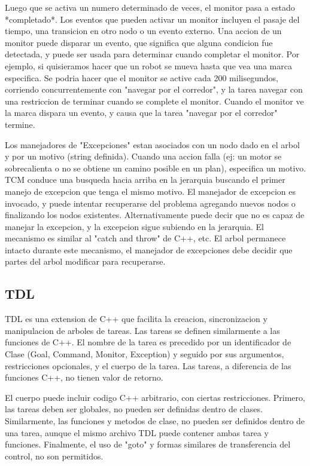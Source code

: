 Luego que se activa un numero determinado de veces, el monitor pasa a 
estado *completado*.
Los eventos que pueden activar un monitor incluyen el pasaje del tiempo, una 
transicion en otro nodo o un evento externo.
Una accion de un monitor puede disparar un evento, que significa que alguna 
condicion fue detectada, y puede ser usada para determinar
cuando completar el monitor.
Por ejemplo, si quisieramos hacer que un robot se mueva hasta que vea una 
marca especifica. Se podria hacer que el monitor se active cada 
200 milisegundos, corriendo concurrentemente con "navegar por el corredor", y 
la tarea navegar con una restriccion de terminar cuando
se complete el monitor.
Cuando el monitor ve la marca dispara un evento, y causa que la tarea "navegar 
por el corredor" termine.

Los manejadores de "Excepciones" estan asociados con un nodo dado en el arbol 
y por un motivo (string definida).
Cuando una accion falla (ej: un motor se sobrecalienta o no se obtiene un 
camino posible en un plan), especifica 
un motivo.
TCM conduce una busqueda hacia arriba en la jerarquia buscando el primer 
manejo de excepcion que tenga el mismo motivo.
El manejador de excepcion es invocado, y puede intentar recuperarse del 
problema agregando nuevos nodos o finalizando los nodos
existentes.
Alternativamente puede decir que no es capaz de manejar la excepcion, y la 
excepcion sigue subiendo en la jerarquia.
El mecanismo es similar al "catch and throw" de C++, etc.
El arbol permanece intacto durante este mecanismo, el manejador de excepciones 
debe decidir que partes del arbol modificar para recuperarse.


\subsection{TDL}

TDL es una extension de C++ que facilita la creacion, sincronizacion y 
manipulacion de arboles de tareas.
Las tareas se definen similarmente a las funciones de C++.
El nombre de la tarea es precedido por un identificador de Clase (Goal, 
Command, Monitor, Exception) y seguido por sus argumentos,
restricciones opcionales, y el cuerpo de la tarea.
Las tareas, a diferencia de las funciones C++, no tienen valor de retorno.

El cuerpo puede incluir codigo C++ arbitrario, con ciertas restricciones.
Primero, las tareas deben ser globales, no pueden ser definidas dentro de 
clases. Similarmente, las funciones
y metodos de clase, no pueden ser definidos dentro de una tarea, aunque el 
mismo archivo TDL puede contener ambas tarea y funciones.
Finalmente, el uso de "goto" y formas similares de transferencia del control, 
no son permitidos.

